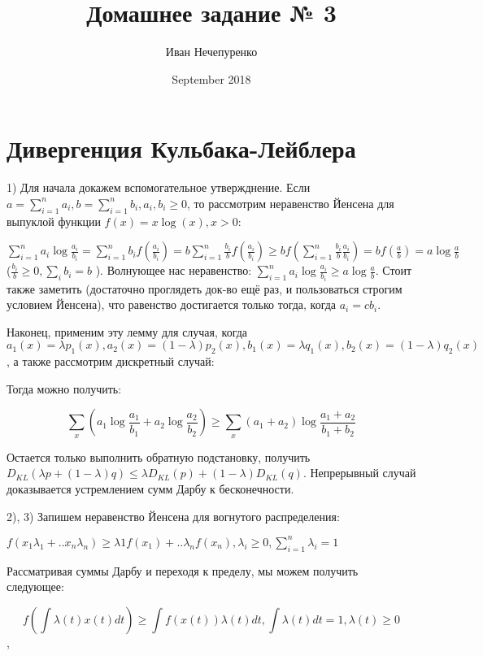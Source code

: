 \documentclass{article}
\title{Домашнее задание № 3}
\author{Иван Нечепуренко }
\date{September 2018}
\begin{document}
\maketitle

\section{Дивергенция Кульбака-Лейблера}

1) Для начала докажем вспомогательное утвержднение. Если
$\displaystyle a = \sum\limits_{i = 1}^n a_i, b = \sum\limits_{i = 1}^n b_i, a_i, b_i \geq 0 $,
то рассмотрим неравенство Йенсена для выпуклой функции $f(x) = x\log(x), x > 0 $:

$\displaystyle \sum\limits_{i=1}^n a_i \log\frac{a_i}{b_i} = 
\sum\limits_{i=1}^n b_i f\left(\frac{a_i}{b_i}\right) = 
b \sum\limits_{i=1}^n \frac{b_i}{b} f\left(\frac{a_i}{b_i}\right) \geq
b f\left(\sum\limits_{i=1}^n \frac{b_i}{b} \frac{a_i}{b_i}\right) = 
b f\left(\frac{a}{b}\right) = a \log\frac{a}{b}
$
($\displaystyle \frac{b_i}{b} \geq 0, \sum\limits_i b_i = b$ ). Волнующее нас неравенство:
$\displaystyle \sum\limits_{i=1}^n a_i \log\frac{a_i}{b_i} \geq a \log\frac{a}{b}$.
Стоит также заметить (достаточно проглядеть док-во ещё раз, и пользоваться строгим условием Йенсена), что равенство достигается только тогда, когда $a_i = cb_i$. 

Наконец, применим эту лемму для случая, когда $a_1(x) = \lambda p_1(x), a_2(x) = (1 - \lambda)p_2(x), b_1(x) = \lambda q_1(x), b_2(x) = (1 - \lambda)q_2(x)$, а также рассмотрим дискретный случай:

Тогда можно получить:

$$ \sum\limits_x (a_1\log\frac{a_1}{b_1} + a_2\log\frac{a_2}{b_2}) \geq 
\sum\limits_x (a_1 + a_2)\log\frac{a_1 + a_2}{b_1 + b_2}$$

Остается только выполнить обратную подстановку, получить $D_{KL}(\lambda p + (1 - \lambda)q) \leq \lambda D_{KL}(p)+ (1 - \lambda)D_{KL}(q)$. Непрерывный случай доказывается устремлением сумм Дарбу к бесконечности.

2), 3) Запишем неравенство Йенсена для вогнутого распределения:

$ \displaystyle
f(x_1\lambda_1 + .. x_n\lambda_n) \geq \lambda1f(x_1) + .. \lambda_nf(x_n), 
\lambda_i \geq 0, \sum\limits_{i = 1}^n \lambda_i = 1 
$

Рассматривая суммы Дарбу и переходя к пределу, мы можем получить следующее:

$$f\left(\int \lambda(t)x(t)dt\right) \geq \int f(x(t))\lambda(t)dt, \int\lambda(t)dt = 1, 
\lambda(t) \geq 0$$, 
\end{document}
